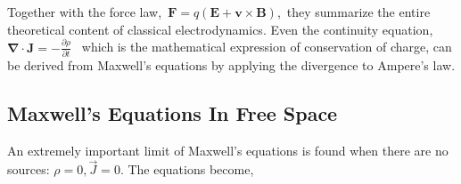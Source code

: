 \begin{center}
\end{center} 
Together with the force law,\ $\mathbf{F}=q(\mathbf{E}+\mathbf{v} \times \mathbf{B})$,\ they summarize the entire theoretical content of classical electrodynamics. Even the continuity equation,\ $\boldsymbol{\nabla} \cdot \mathbf{J}=-\frac{\partial \rho}{\partial t}$ \ which is the mathematical expression of conservation of charge, can be derived from Maxwell's equations by applying the divergence to Ampere's law.
\subsection{Maxwell's Equations In Free Space}
An extremely important limit of Maxwell's equations is found when there are no sources: $\rho=0, \vec{J}=0 .$ The equations become,
\begin{center}
\end{center}

